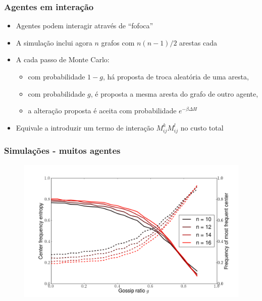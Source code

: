 \documentclass[ignorenonframetext,]{beamer}
\makeatletter
\def\ScaleIfNeededV{%
  \ifdim\Gin@nat@width>0.9\linewidth
    0.9\linewidth
  \else
    \Gin@nat@width
  \fi
}
\def\ScaleIfNeededH{%
  \ifdim\Gin@nat@height>0.9\textheight
    0.9\textheight
  \else
    \Gin@nat@height
  \fi
}
\let\Oldincludegraphics\includegraphics
\renewcommand{\includegraphics}[2][]{\Oldincludegraphics[width=\ScaleIfNeededV,height=\ScaleIfNeededH,keepaspectratio]{#2}}
\makeatother
\begin{document}
\begin{frame}\frametitle{Agentes em interação}

\begin{itemize}
\itemsep1pt\parskip0pt
\item
  Agentes podem interagir através de ``fofoca''
\item
  A simulação inclui agora $n$ grafos com $n(n-1)/2$ arestas cada
\item
  A cada passo de Monte Carlo:

  \begin{itemize}
  \itemsep1pt\parskip0pt
  \item
    com probabilidade $1-g$, há proposta de troca aleatória de uma
    aresta,
  \item
    com probabilidade $g$, é proposta a mesma aresta do grafo de outro
    agente,
  \item
    a alteração proposta é aceita com probabilidade
    $e^{-\beta \Delta H}$
  \end{itemize}
\item
  Equivale a introduzir um termo de interação $M^k_{ij} M^l_{ij}$ no
  custo total
\end{itemize}

\end{frame}

\begin{frame}\frametitle{Simulações - muitos agentes}

\begin{figure}[htbp]
\centering
\includegraphics{./figs/gossip.png}
\end{figure}

\end{frame}
\end{document}
